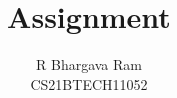 \documentclass[journal,12pt,twocolumn]{IEEEtran}
\begin{document}
\let\vec\mathbf
\renewcommand{\thefigure}{\theproblem}
\def\putbox#1#2#3{\makebox[0in][l]{\makebox[#1][l]{}\raisebox{\baselineskip}[0in][0in]{\raisebox{#2}[0in][0in]{#3}}}}
     \def\rightbox#1{\makebox[0in][r]{#1}}
     \def\centbox#1{\makebox[0in]{#1}}
     \def\topbox#1{\raisebox{-\baselineskip}[0in][0in]{#1}}
     \def\midbox#1{\raisebox{-0.5\baselineskip}[0in][0in]{#1}}
\title{
	Assignment
}
\author{ R Bhargava Ram\\CS21BTECH11052%
}	
%
%
%
% 
%
\end{document}
